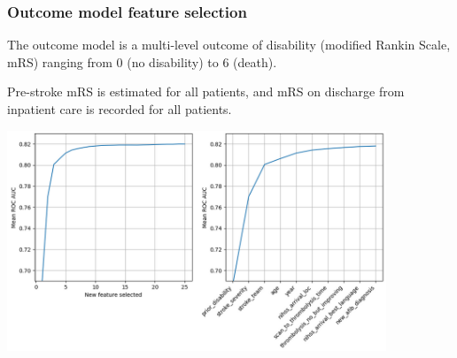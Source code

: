 \begin{frame}
\frametitle{Outcome model feature selection}

The outcome model is a multi-level outcome of disability (modified Rankin Scale, mRS) ranging from 0 (no disability) to 6 (death). 

\vspace{2mm}

Pre-stroke mRS is estimated for all patients, and mRS on discharge from inpatient care is recorded for all patients.

\vspace{3mm}

\begin{center}
\includegraphics[width=0.85\textwidth]{./images_outcome/outcome_feature_selection}
\end{center}


\end{frame}